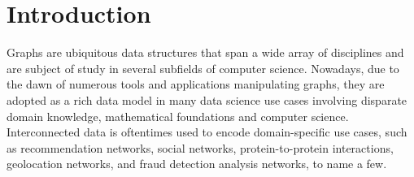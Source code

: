 \section{Introduction}
\label{sec:intro}



Graphs are ubiquitous data structures that span a wide array of disciplines
and are subject of study in several subfields of computer science.
Nowadays, due to the dawn of numerous tools and applications manipulating
graphs, they are adopted as a rich data model in many data science use
cases involving disparate domain knowledge, mathematical foundations and
computer science. Interconnected data is oftentimes used to encode domain-specific 
use cases, such as recommendation networks, social networks,
protein-to-protein interactions, geolocation networks, and fraud detection analysis networks, to
name a few.   

